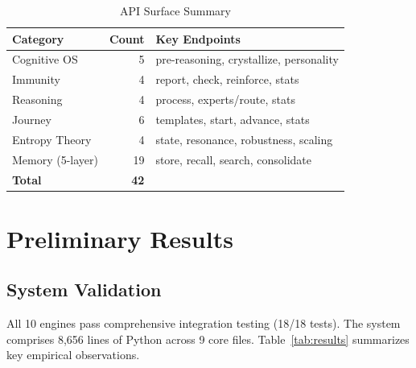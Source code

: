 \documentclass[11pt,a4paper]{article}
\begin{document}
\begin{table}[h]
\centering
\caption{API Surface Summary}
\label{tab:endpoints}
\begin{tabular}{lrl}
\toprule
\textbf{Category} & \textbf{Count} & \textbf{Key Endpoints} \\
\midrule
Cognitive OS     & 5  & pre-reasoning, crystallize, personality \\
Immunity         & 4  & report, check, reinforce, stats \\
Reasoning        & 4  & process, experts/route, stats \\
Journey          & 6  & templates, start, advance, stats \\
Entropy Theory   & 4  & state, resonance, robustness, scaling \\
Memory (5-layer) & 19 & store, recall, search, consolidate \\
\midrule
\textbf{Total}   & \textbf{42} & \\
\bottomrule
\end{tabular}
\end{table}


\section{Preliminary Results}

\subsection{System Validation}

All 10 engines pass comprehensive integration testing (18/18 tests).
The system comprises 8,656 lines of Python across 9 core files.
Table~\ref{tab:results} summarizes key empirical observations.
\end{document}
